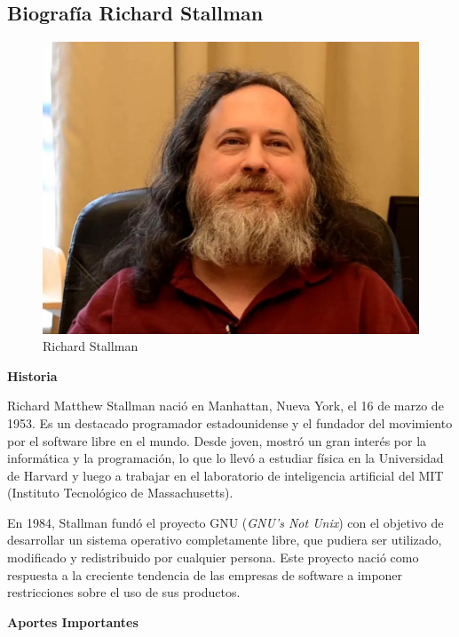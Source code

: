 \documentclass[11pt,twoside]{book}
\begin{document}
\newpage
\subsection{{\bfseries Biografía Richard Stallman}}

\begin{figure}[htb]
  \centering
  \includegraphics[width=0.5\linewidth]{R.S.1.png}
  \caption{Richard Stallman}
  \label{fig:etiqueta}
\end{figure}
\vspace{5pt}
\textbf{Historia}

Richard Matthew Stallman nació en Manhattan, Nueva York, el 16 de marzo de 1953. Es un destacado programador estadounidense y el fundador del movimiento por el software libre en el mundo. Desde joven, mostró un gran interés por la informática y la programación, lo que lo llevó a estudiar física en la Universidad de Harvard y luego a trabajar en el laboratorio de inteligencia artificial del MIT (Instituto Tecnológico de Massachusetts).

En 1984, Stallman fundó el proyecto GNU (\textit{GNU's Not Unix}) con el objetivo de desarrollar un sistema operativo completamente libre, que pudiera ser utilizado, modificado y redistribuido por cualquier persona. Este proyecto nació como respuesta a la creciente tendencia de las empresas de software a imponer restricciones sobre el uso de sus productos.

\textbf{Aportes Importantes}
\end{document}
